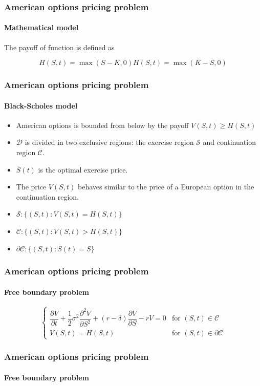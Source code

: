 \documentclass{beamer}
\begin{document}
\begin{frame}
    \frametitle{American options pricing problem}
    \framesubtitle{Mathematical model}
    The payoff of function is defined as

    \begin{subequations}
        \begin{equation}
            H(S, t) = \max(S - K, 0)
        \end{equation}
        \begin{equation}
            H(S, t) = \max(K-S, 0)
        \end{equation}
    \end{subequations}
\end{frame}

\begin{frame}
    \frametitle{American options pricing problem}
    \framesubtitle{Black-Scholes model}
    \begin{itemize}
        \item American options is bounded from below by the payoff $V(S, t) \ge H(S, t)$
        \item $\mathcal{D}$ is divided in two exclusive regions: the exercise region $\mathcal{S}$ and continuation region $\mathcal{C}$. 
        \item $\bar{S}(t)$ is the optimal exercise price.
        \item The price $V(S, t)$ behaves similar to the price of a European option in the continuation region.
        \item $\mathcal{S}: \{(S,t): V(S, t) = H(S, t)\}$
        \item $\mathcal{C}: \{(S,t): V(S, t) > H(S, t)\}$
        \item $\partial{\mathcal{C}}: \{(S,t): \bar{S}(t) = S\}$
    \end{itemize}
\end{frame}

\begin{frame}
    \frametitle{American options pricing problem}
    \framesubtitle{Free boundary problem}

    \begin{equation}
        \begin{cases}
            \dfrac{\partial{V}}{\partial{t}} + \dfrac{1}{2}\sigma^2\dfrac{\partial^2{V}}{\partial{S^2}} + (r-\delta)\dfrac{\partial{V}}{\partial{S}} - rV = 0 & \text{for $(S, t) \in \mathcal{C}$} \\
            V(S, t) = H(S, t) & \text{for $(S, t) \in \partial{\mathcal{C}}$}
        \end{cases}
    \end{equation}
\end{frame}

\begin{frame}
    \frametitle{American options pricing problem}
    \framesubtitle{Free boundary problem}


\end{frame}
\end{document}
